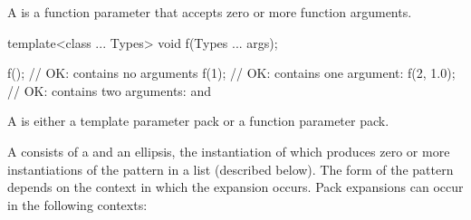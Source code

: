 \pnum
A  is a function parameter
that accepts zero or more function arguments. \enterexample

\begin{codeblock}
template<class ... Types> void f(Types ... args);

f();                // OK:  contains no arguments
f(1);               // OK:  contains one argument: 
f(2, 1.0);          // OK:  contains two arguments:  and 
\end{codeblock}

\exitexample

\pnum
A  is either a template parameter
pack or a function parameter pack.

\pnum
A 
consists of a  and an ellipsis, the instantiation of which
produces zero or more instantiations of the pattern in a list (described below).
The form of the pattern
depends on the context in which the expansion occurs. Pack
expansions can occur in the following contexts:


